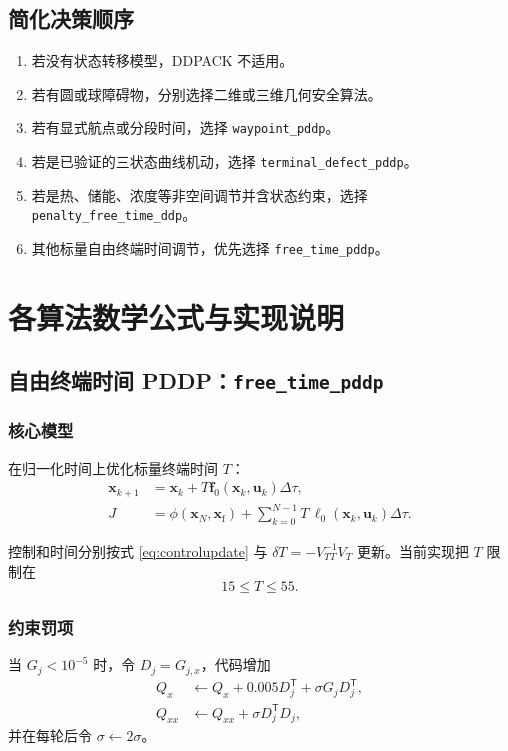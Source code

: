 \documentclass[UTF8,zihao=-4,openany,fontset=fandol]{ctexbook}
\newcommand{\code}[1]{\nolinkurl{#1}}
\begin{document}
\section{简化决策顺序}

\begin{enumerate}[leftmargin=2.4em]
  \item 若没有状态转移模型，DDPACK 不适用。
  \item 若有圆或球障碍物，分别选择二维或三维几何安全算法。
  \item 若有显式航点或分段时间，选择 \code{waypoint_pddp}。
  \item 若是已验证的三状态曲线机动，选择 \code{terminal_defect_pddp}。
  \item 若是热、储能、浓度等非空间调节并含状态约束，选择
        \code{penalty_free_time_ddp}。
  \item 其他标量自由终端时间调节，优先选择 \code{free_time_pddp}。
\end{enumerate}

\chapter{各算法数学公式与实现说明}

\section{自由终端时间 PDDP：\texorpdfstring{\texttt{free\_time\_pddp}}{free-time-pddp}}

\subsection{核心模型}

在归一化时间上优化标量终端时间 $T$：
\begin{align}
  \bm{x}_{k+1}
  &=\bm{x}_k+T\bm{f}_0(\bm{x}_k,\bm{u}_k)\Delta\tau,\\
  J&=\phi(\bm{x}_N,\bm{x}_{\mathrm f})
  +\sum_{k=0}^{N-1}
  T\,\ell_0(\bm{x}_k,\bm{u}_k)\Delta\tau.
\end{align}

控制和时间分别按式 \eqref{eq:controlupdate} 与
$\delta T=-V_{TT}^{-1}V_T$ 更新。当前实现把 $T$ 限制在
\[
  15\le T\le 55.
\]

\subsection{约束罚项}

当 $G_j<10^{-5}$ 时，令 $D_j=G_{j,x}$，代码增加
\begin{align}
  Q_x&\leftarrow Q_x+
  0.005D_j^\mathsf{T}
  +\sigma G_jD_j^\mathsf{T},\\
  Q_{xx}&\leftarrow Q_{xx}+
  \sigma D_j^\mathsf{T}D_j,
\end{align}
并在每轮后令 $\sigma\leftarrow 2\sigma$。
\end{document}
